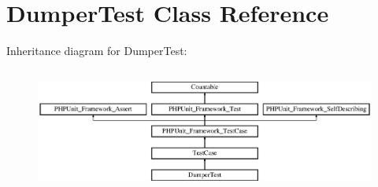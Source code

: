 \hypertarget{class_symfony_1_1_component_1_1_yaml_1_1_tests_1_1_dumper_test}{}\section{Dumper\+Test Class Reference}
\label{class_symfony_1_1_component_1_1_yaml_1_1_tests_1_1_dumper_test}
Inheritance diagram for Dumper\+Test\+:\begin{figure}[H]
\begin{center}
\leavevmode
\includegraphics[height=4.129793cm]{class_symfony_1_1_component_1_1_yaml_1_1_tests_1_1_dumper_test}
\end{center}
\end{figure}
